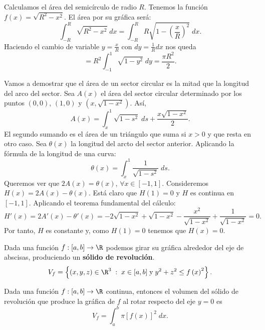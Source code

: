 \begin{eg}
\normalfont Calculamos el área del semicírculo de radio $\displaystyle R $. Tenemos la función $\displaystyle f\left(x\right) = \sqrt{R^{2}-x^{2}} $. El área por su gráfica será:
\[\int^{R}_{-R} \sqrt{R^{2}-x^{2}} \; dx = \int^{R}_{-R} R \sqrt{1 - \left(\frac{x}{R}\right)^{2}} \; dx .\]
Haciendo el cambio de variable $\displaystyle y = \frac{x}{R} $ con $\displaystyle dy = \frac{1}{R}dx $ nos queda
\[= R^{2}\int^{1}_{-1} \sqrt{1-y^{2}} \; dy = \frac{\pi R^{2}}{2} .\]
\end{eg}
\begin{eg}
\normalfont Vamos a demostrar que el área de un sector circular es la mitad que la longitud del arco del sector. Sea $\displaystyle A\left(x\right) $ el área del sector circular determinado por los puntos $\displaystyle \left(0,0\right) $, $\displaystyle \left(1,0\right) $ y $\displaystyle \left(x, \sqrt{1-x^{2}}\right) $. Así,
\[A\left(x\right)= \int^{1}_{x} \sqrt{1-s^{2}} \; d s  + \frac{x\sqrt{1-x^{2}}}{2} .\]
El segundo sumando es el área de un triángulo que suma si $\displaystyle x > 0 $ y que resta en otro caso. Sea $\displaystyle \theta\left(x\right) $ la longitud del arcto del sector anterior. Aplicando la fórmula de la longitud de una curva:
\[\theta\left(x\right) = \int^{1}_{x} \frac{1}{\sqrt{1-s^{2}}} \; d s .\]
Queremos ver que $\displaystyle 2A\left(x\right) = \theta\left(x\right) $, $\displaystyle \forall x \in \left[-1,1\right]  $. Consideremos $\displaystyle H\left(x\right) = 2A\left(x\right) -\theta\left(x\right) $. Está claro que $\displaystyle H\left(1\right) = 0 $ y $\displaystyle H $ es continua en $\displaystyle \left[-1,1\right]  $. Aplicando el teorema fundamental del cálculo:
\[H'\left(x\right) = 2A'\left(x\right)-\theta'\left(x\right) = -2\sqrt{1-x^{2}}+\sqrt{1-x^{2}}-\frac{x^{2}}{\sqrt{1-x^{2}}}+\frac{1}{\sqrt{1-x^{2}}} = 0 .\]
Por tanto, $\displaystyle H $ es constante y, como $\displaystyle H\left(1\right) = 0 $ tenemos que $\displaystyle H\left(x\right) = 0 $.
\end{eg}
\begin{fdefinition}[]
	\normalfont Dada una función $\displaystyle f : \left[a,b\right] \to \R $ podemos girar su gráfica alrededor del eje de abscisas, produciendo un \textbf{sólido de revolución}.
	\[V_{f} = \left\{ \left(x,y,z\right) \in \R^{3} \; : \; x \in [a,b] \; \text{y} \; y^{2} + z^{2} \leq f\left(x\right)^{2}\right\}  .\]
\end{fdefinition}
\begin{ftheorem}[]
	\normalfont Dada una función $\displaystyle f : [a,b] \to \R $ continua, entonces el volumen del sólido de revolución que produce la gráfica de $\displaystyle f $ al rotar respecto del eje $\displaystyle y = 0 $ es 
	\[ V_{f} = \int^{b}_{a} \pi [f\left(x\right)]^{2} \; dx .\]
\end{ftheorem}
